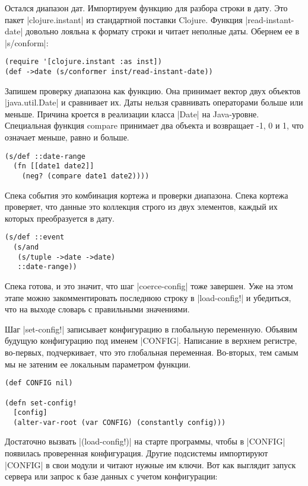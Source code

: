 Остался диапазон дат. Импортируем функцию для разбора строки в дату. Это пакет
\spverb|clojure.instant| из стандартной поставки Clojure. Функция \spverb|read-instant-date|
довольно лояльна к формату строки и читает неполные даты. Обернем ее в
\spverb|s/conform|:

\begin{verbatim}
(require '[clojure.instant :as inst])
(def ->date (s/conformer inst/read-instant-date))
\end{verbatim}

Запишем проверку диапазона как функцию. Она принимает вектор двух объектов
\spverb|java.util.Date| и сравнивает их. Даты нельзя сравнивать операторами больше или
меньше. Причина кроется в реализации класса \spverb|Date| на Java-уровне. Специальная
функция compare принимает два объекта и возвращает -1, 0 и 1, что означает
меньше, равно и больше.

\begin{verbatim}
(s/def ::date-range
  (fn [[date1 date2]]
    (neg? (compare date1 date2))))
\end{verbatim}

Спека события это комбинация кортежа и проверки диапазона. Спека кортежа
проверяет, что данные это коллекция строго из двух элементов, каждый их которых
преобразуется в дату.

\begin{verbatim}
(s/def ::event
  (s/and
   (s/tuple ->date ->date)
   ::date-range))
\end{verbatim}

Спека готова, и это значит, что шаг \spverb|coerce-config| тоже завершен. Уже на этом
этапе можно закомментировать последнюю строку в \spverb|load-config!| и убедиться, что
на выходе словарь с правильными значениями.

Шаг \spverb|set-config!| записывает конфигурацию в глобальную переменную. Объявим
будущую конфигурацию под именем \spverb|CONFIG|. Написание в верхнем регистре,
во-первых, подчеркивает, что это глобальная переменная. Во-вторых, тем самым мы
не затеним ее локальным параметром функции.

\begin{verbatim}
(def CONFIG nil)

(defn set-config!
  [config]
  (alter-var-root (var CONFIG) (constantly config)))
\end{verbatim}

Достаточно вызвать \spverb|(load-config!)| на старте программы, чтобы в \spverb|CONFIG|
появилась проверенная конфигурация. Другие подсистемы импортируют \spverb|CONFIG| в
свои модули и читают нужные им ключи. Вот как выглядит запуск сервера или запрос
к базе данных с учетом конфигурации:

